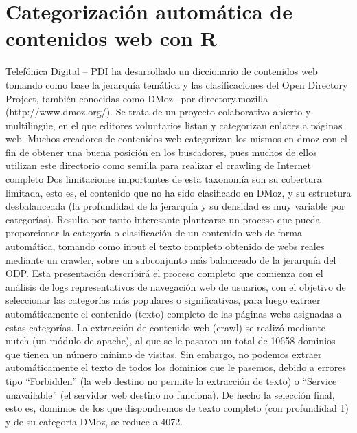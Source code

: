 \chapter{Categorización automática de contenidos web con R}




Telefónica Digital – PDI ha desarrollado un diccionario de contenidos web tomando como base la jerarquía temática y las clasificaciones del Open Directory Project, también conocidas como DMoz –por directory.mozilla (http://www.dmoz.org/). Se trata de un proyecto colaborativo abierto y multilingüe, en el que editores voluntarios listan y categorizan enlaces a páginas web. Muchos creadores de contenidos web categorizan los mismos en dmoz con el fin de obtener una buena posición en los buscadores, pues muchos de ellos utilizan este directorio como semilla para realizar el crawling de Internet completo
Dos limitaciones importantes de esta taxonomía son su cobertura limitada, esto es, el contenido que no ha sido clasificado en DMoz, y su estructura desbalanceada (la profundidad de la jerarquía y su densidad es muy variable por categorías). Resulta por tanto interesante plantearse un proceso que pueda proporcionar la categoría o clasificación de un contenido web de forma automática, tomando como input el texto completo obtenido de webs reales mediante un crawler, sobre un subconjunto más balanceado de la jerarquía del ODP. Esta presentación describirá el proceso completo que comienza con el análisis de logs representativos de navegación web de usuarios, con el objetivo de seleccionar las categorías más populares o significativas, para luego extraer automáticamente el contenido (texto) completo de las páginas webs asignadas a estas categorías. 
La extracción de contenido web (crawl) se realizó mediante nutch (un módulo de apache), al que se le pasaron un total de 10658 dominios que tienen un número mínimo de visitas.  Sin embargo, no podemos extraer automáticamente el texto de todos los dominios que le pasemos, debido a errores tipo “Forbidden” (la web destino no permite la extracción de texto) o “Service unavailable” (el servidor web destino no funciona).  De hecho la selección final, esto es, dominios de los que dispondremos de texto completo (con profundidad 1) y de su categoría DMoz, se reduce a 4072. 
